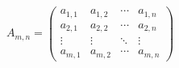\documentclass[12pt]{article}
\begin{document}
$ \begin{equation*}    A_{m,n} =     \begin{pmatrix}    a_{1,1} & a_{1,2} & \cdots & a_{1,n} \\    a_{2,1} & a_{2,2} & \cdots & a_{2,n} \\    \vdots  & \vdots  & \ddots & \vdots  \\    a_{m,1} & a_{m,2} & \cdots & a_{m,n}     \end{pmatrix}    \end{equation*} $
\end{document}
